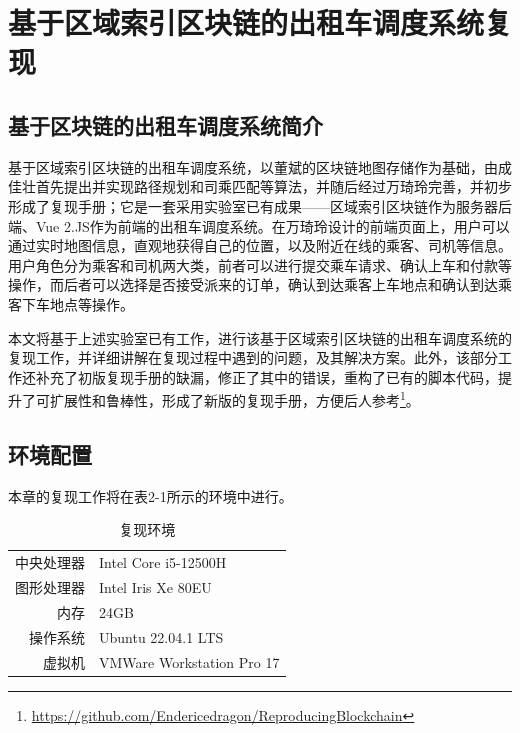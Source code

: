 %
%
%
%
%

\chapter{基于区域索引区块链的出租车调度系统复现}

\section{基于区块链的出租车调度系统简介}

基于区域索引区块链的出租车调度系统，以董斌的区块链地图存储作为基础，由成佳壮首先提出并实现路径规划和司乘匹配等算法，并随后经过万琦玲完善，并初步形成了复现手册；它是一套采用实验室已有成果——区域索引区块链作为服务器后端、Vue 2.JS作为前端的出租车调度系统。在万琦玲设计的前端页面上，用户可以通过实时地图信息，直观地获得自己的位置，以及附近在线的乘客、司机等信息。用户角色分为乘客和司机两大类，前者可以进行提交乘车请求、确认上车和付款等操作，而后者可以选择是否接受派来的订单，确认到达乘客上车地点和确认到达乘客下车地点等操作。

本文将基于上述实验室已有工作，进行该基于区域索引区块链的出租车调度系统的复现工作，并详细讲解在复现过程中遇到的问题，及其解决方案。此外，该部分工作还补充了初版复现手册的缺漏，修正了其中的错误，重构了已有的脚本代码，提升了可扩展性和鲁棒性，形成了新版的复现手册，方便后人参考\footnote{\url{https://github.com/Endericedragon/ReproducingBlockchain}}。

\section{环境配置}

本章的复现工作将在表2-1所示的环境中进行。

\begin{table}[htbp]
    \linespread{1.5}
    \centering
    \caption{复现环境}\label{复现环境}
    \begin{tabular}{r|l} \toprule
        中央处理器 & Intel Core i5-12500H      \\
        图形处理器 & Intel Iris Xe 80EU        \\
        内存    & 24GB                      \\
        操作系统  & Ubuntu 22.04.1 LTS        \\
        虚拟机   & VMWare Workstation Pro 17 \\
        \bottomrule
    \end{tabular}
\end{table}

